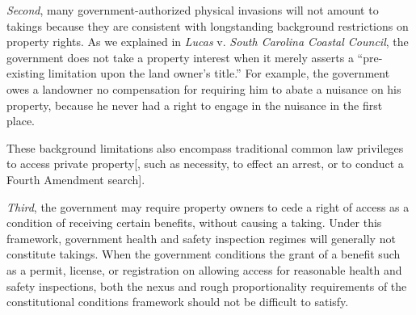 \textit{Second}, many government-authorized physical invasions will not amount
to takings because they are consistent with longstanding background restrictions
on property rights. As we explained in \textit{Lucas} v. \textit{South Carolina
Coastal Council}, the government does not take a property interest when it
merely asserts a ``pre-existing limitation upon the land owner's title.'' For
example, the government owes a landowner no compensation for requiring him to
abate a nuisance on his property, because he never had a right to engage in the
nuisance in the first place. 


These background limitations also encompass traditional common law privileges to
access private property[, such as necessity, to effect an arrest, or to conduct
a Fourth Amendment search].


\textit{Third}, the government may require property owners to cede a right of
access as a condition of receiving certain benefits, without causing a taking.
%
%
Under this framework, government health and safety inspection regimes will
generally not constitute takings. When the government conditions the grant of a
benefit such as a permit, license, or registration on allowing access for
reasonable health and safety inspections, both the nexus and rough
proportionality requirements of the constitutional conditions framework should
not be difficult to satisfy.



